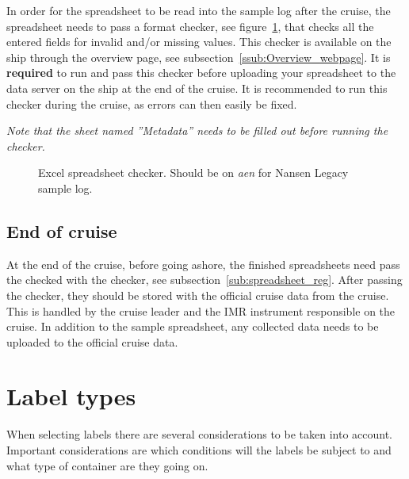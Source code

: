 \documentclass[a4paper,english, 11pt]{article}
\begin{document}
In order for the spreadsheet to be read into the sample log after the cruise, the spreadsheet needs to pass a format checker, see figure~\ref{fig:checker}, that checks all the entered fields for invalid and/or missing values. This checker is available on the ship through the overview page, see subsection~\ref{ssub:Overview_webpage}. It is \textbf{required} to run and pass this checker before uploading your spreadsheet to the data server on the ship at the end of the cruise. It is recommended to run this checker during the cruise, as errors can then easily be fixed.

\emph{Note that the sheet named ''Metadata'' needs to be filled out before running the checker.}

\begin{figure}[htb]
    \caption{\label{fig:checker}
        Excel spreadsheet checker. Should be on \emph{aen} for Nansen Legacy sample log.
    }
\end{figure}


\subsection{End of cruise} %
\label{sub:end_of_cruise}

At the end of the cruise, before going ashore, the finished spreadsheets need pass the checked with the checker, see subsection~\ref{sub:spreadsheet_reg}. After passing the checker, they should be stored with the official cruise data from the cruise. This is handled by the cruise leader and the IMR instrument responsible on the cruise. In addition to the sample spreadsheet, any collected data needs to be uploaded to the official cruise data.

\section{Label types} %
\label{sub:Labels}

When selecting labels there are several considerations to be taken into account. Important considerations are which conditions will the labels be subject to and what type of container are they going on.
\end{document}
